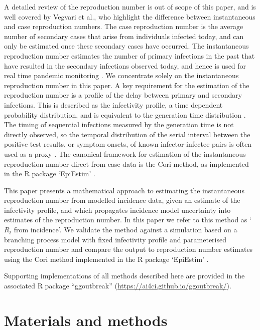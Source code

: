 \documentclass[10pt,letterpaper]{article}
\begin{document}
A detailed review of the reproduction number is out of scope of this paper, and is well covered by Vegvari et al.\cite{vegvari2022}, who highlight the difference between instantaneous and case reproduction numbers. The case reproduction number is the average number of secondary cases that arise from individuals infected today, and can only be estimated once these secondary cases have occurred. The instantaneous reproduction number estimates the number of primary infections in the past that have resulted in the secondary infections observed today, and hence is used for real time pandemic monitoring \cite{gostic2020}. We concentrate solely on the instantaneous reproduction number in this paper. A key requirement for the estimation of the reproduction number is a profile of the delay between primary and secondary infections. This is described as the infectivity profile, a time dependent probability distribution, and is equivalent to the generation time distribution \cite{gostic2020,park2021}. The timing of sequential infections measured by the generation time is not directly observed, so the temporal distribution of the serial interval between the positive test results, or symptom onsets, of known infector-infectee pairs is often used as a proxy \cite{park2021, thompson2019}. The canonical framework for estimation of the instantaneous reproduction number direct from case data is the Cori method, as implemented in the R package `EpiEstim' \cite{thompson2019}.

This paper presents a mathematical approach to estimating the instantaneous reproduction number from modelled incidence data, given an estimate of the infectivity profile, and which propagates incidence model uncertainty into estimates of the reproduction number. In this paper we refer to this method as `$R_t$ from incidence'. We validate the method against a simulation based on a branching process model with fixed infectivity profile and parameterised reproduction number and compare the output to reproduction number estimates using the Cori method implemented in the R package `EpiEstim' \cite{thompson2019}.

Supporting implementations of all methods described here are provided in the associated R package ``ggoutbreak'' (\url{https://ai4ci.github.io/ggoutbreak/}).

\section*{Materials and methods}
\end{document}
